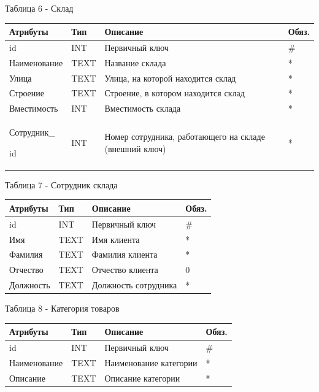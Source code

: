 \documentclass[14pt]{extreport}
\begin{document}
\newpage

\noindent
Таблица 6 - Склад

\begin{center}
\begin{longtable}{ |m{3.3cm}|m{3cm}|m{6cm}|m{1.8cm}| } 
 \hline
 Атрибуты & Тип & Описание & Обяз. \\ [0.5ex] 
 \hline\hline
 id & INT & Первичный ключ & \# \\
 \hline
 Наименование & TEXT & Название склада & * \\
 \hline
 Улица & TEXT & Улица, на которой находится склад & * \\
 \hline
 Строение & TEXT & Строение, в котором находится склад & * \\
 \hline
 Вместимость & INT & Вместимость склада & * \\
 \hline
 Сотрудник\_
 
 id & INT & Номер сотрудника, работающего на складе (внешний ключ) & * \\
 \hline
\end{longtable}
\end{center}



\noindent
Таблица 7 - Сотрудник склада

\begin{center}
\begin{longtable}{ |m{3.3cm}|m{3cm}|m{6cm}|m{1.8cm}| } 
 \hline
 Атрибуты & Тип & Описание & Обяз. \\ [0.5ex] 
 \hline\hline
 id & INT & Первичный ключ & \# \\
 \hline
 Имя & TEXT & Имя клиента & * \\
 \hline
 Фамилия & TEXT & Фамилия клиента & * \\
 \hline
 Отчество & TEXT & Отчество клиента & 0 \\
 \hline
 Должность & TEXT & Должность сотрудника & * \\
 \hline
\end{longtable}
\end{center}

\newpage

\noindent
Таблица 8 - Категория товаров

\begin{center}
\begin{longtable}{ |m{3.3cm}|m{3cm}|m{6cm}|m{1.8cm}| } 
 \hline
 Атрибуты & Тип & Описание & Обяз. \\ [0.5ex] 
 \hline\hline
 id & INT & Первичный ключ & \# \\
 \hline
 Наименование & TEXT & Наименование категории & * \\
 \hline
 Описание & TEXT & Описание категории & * \\
 \hline
\end{longtable}
\end{center}
\end{document}
